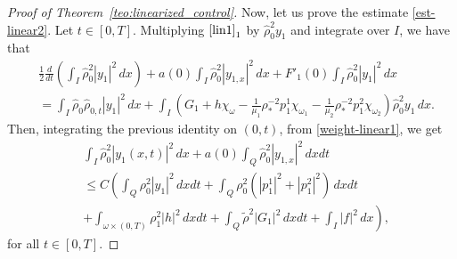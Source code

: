 \documentclass[11pt,a4paper]{amsart}
\numberwithin{equation}{section}
\begin{document}
\begin{proof}[Proof of Theorem~\ref{teo:linearized_control}]
Now, let us prove  the estimate \eqref{est-linear2}. Let $t \in [0, T]$.  Multiplying 
$\eqref{lin1}_{1}$ by $\hat{\rho}^{2}_{0}y_{1}$ and integrate over  $I$, we have that
\begin{align*}
	&\frac{1}{2}\frac{d}{dt} \left( \int_{I}\hat{\rho}^{2}_{0}|y_{1}|^{2}\,dx \right)+a(0)\int_{I}\hat{\rho}^{2}_{0}|y_{1,x}|^{2}\,dx + F'_{1}(0)\int_{I}\hat{\rho}^{2}_{0}|y_{1}|^{2}\,dx \\
   & =\int_{I}\hat{\rho}_{0}\hat{\rho}_{0,t}|y_{1}|^{2}\,dx +\int_{I}\left(G_{1}+h\chi_{\omega}-\frac{1}{\mu_{1}}\rho^{-2}_{\ast}p^{1}_{1}\chi_{\omega_{1}}-\frac{1}{\mu_{2}}\rho^{-2}_{\ast}p^{2}_{1}\chi_{\omega_{2}}    \right)\hat{\rho}^{2}_{0}y_{1}\,dx.
\end{align*}Then, integrating the previous  identity on $(0,t)$, from \eqref{weight-linear1},  we get 
\begin{equation}\label{linear-eq3}
\begin{split}
&\int_{I}\hat{\rho}^{2}_{0}|y_{1}(x,t)|^{2}\,dx+a(0)\int_{Q}\hat{\rho}^{2}_{0}|y_{1,x}|^{2}\,dx dt \\
&\leq C\left( \int_{Q}\rho^{2}_{0}|y_{1}|^{2}\,dxdt+\int_{Q}\rho^{2}_{0}(|p^{1}_{1}|^{2}+|p^{2}_{1}|^{2})\,dxdt \right.\\
			 &\left. +\int_{\omega\times(0,T)}\rho^{2}_{1}|h|^{2}\,dxdt+\int_{Q}\tilde{\rho}^{2}|G_{1}|^{2}\,dxdt+\int_{I}|f|^{2}\,dx \right),
\end{split}
\end{equation}for all $t \in [0, T]$.


\end{proof}
\end{document}
